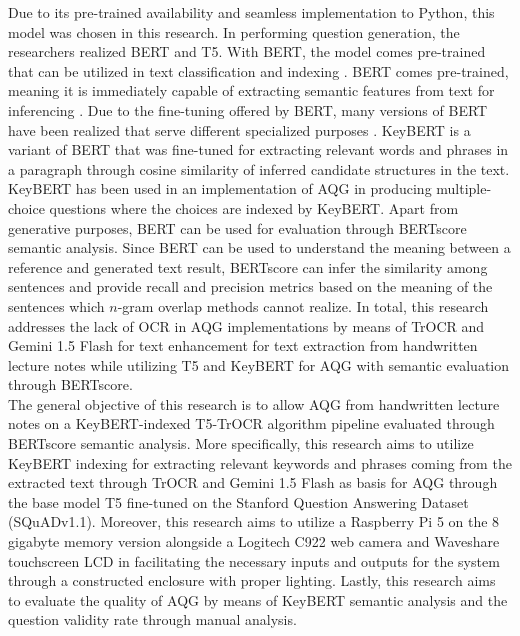 \documentclass[conference]{IEEEtran}
\begin{document}
Due to its pre-trained availability and seamless implementation to 
Python, this model was chosen in this research. In performing question
generation, the researchers realized BERT and T5. With BERT, 
the model comes pre-trained that can be utilized in text classification
and indexing \cite{Fernandez2023} \cite{Mingua2021}. 
BERT comes pre-trained, meaning it is 
immediately capable of extracting semantic features from 
text for inferencing \cite{Liu2023}. Due to the fine-tuning 
offered by BERT, many versions of BERT have been realized 
that serve different specialized purposes \cite{Patra2024}. 
KeyBERT is a variant of BERT that was fine-tuned for extracting 
relevant words and phrases in a paragraph through cosine 
similarity of inferred candidate structures in the text. 
KeyBERT has been used in an implementation of AQG \cite{Talupuri2024}
in producing multiple-choice questions where the choices are 
indexed by KeyBERT. Apart from generative purposes, BERT can be 
used for evaluation through BERTscore semantic analysis. 
Since BERT can be used to understand the meaning between a reference 
and generated text result, BERTscore can infer the similarity 
among sentences and provide recall and precision metrics based on
the meaning of the sentences \cite{Zhang2019} which $n$-gram overlap 
methods cannot realize. In total, this research addresses 
the lack of OCR in AQG implementations by means of TrOCR and 
Gemini 1.5 Flash for text enhancement for 
text extraction from handwritten lecture notes while utilizing 
T5 and KeyBERT for AQG with semantic evaluation through 
BERTscore.\\
\indent The general objective of this research is to allow AQG from 
handwritten lecture notes on a KeyBERT-indexed T5-TrOCR algorithm pipeline 
evaluated through BERTscore semantic analysis. More specifically, 
this research aims to utilize KeyBERT indexing for extracting 
relevant keywords and phrases coming from the extracted text 
through TrOCR and Gemini 1.5 Flash as basis for AQG through the base model T5 fine-tuned 
on the Stanford Question Answering Dataset (SQuADv1.1). 
Moreover, this research aims to utilize a Raspberry Pi 5 on the 8 gigabyte 
memory version alongside a Logitech C922 web camera and Waveshare touchscreen 
LCD in facilitating the necessary inputs and outputs for the system through
a constructed enclosure with proper lighting. Lastly, this research 
aims to evaluate the quality of AQG by means of KeyBERT semantic analysis 
and the question validity rate through manual analysis. \\ 
\end{document}
